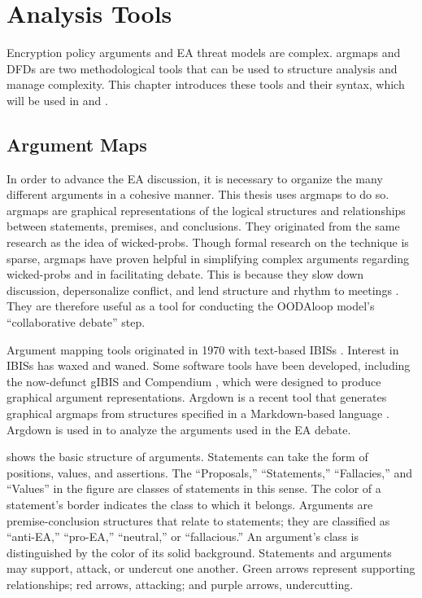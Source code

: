 \chapter{Analysis Tools}
\label{chap-tools}

Encryption policy arguments and \acl{EA} threat models are complex. \Acp{argmap} and \aclp{DFD} are two methodological
tools that can be used to structure analysis and manage complexity. This chapter introduces these tools and their
syntax, which will be used in  and .


\section{Argument Maps}
\label{sec-arg-maps-intro}

In order to advance the \ac{EA} discussion, it is necessary to organize the many different arguments in a cohesive
manner. This thesis uses \acp{argmap} to do so. \Acp{argmap} are graphical representations of the logical structures and
relationships between statements, premises, and conclusions. They originated from the same research as the idea of
\acp{wicked-prob}. Though formal research on the technique is sparse, \acp{argmap} have proven helpful in simplifying
complex arguments regarding \acp{wicked-prob} \cite{renton_2007} and in facilitating debate. This is because they slow
down discussion, depersonalize conflict, and lend structure and rhythm to meetings \cite{dutoit_hypermedia_2006}. They
are therefore useful as a tool for conducting the \ac{OODAloop} model's ``collaborative debate'' step.

Argument mapping tools originated in 1970 with text-based \acp{IBIS} \cite{kunz_issues_1970}. Interest in \acp{IBIS} has
waxed and waned. Some software tools have been developed, including the now-defunct gIBIS \cite{conklin_gibis_1988} and
Compendium \cite{dutoit_hypermedia_2006}, which were designed to produce graphical argument representations. Argdown is
a recent tool that generates graphical \acp{argmap} from structures specified in a Markdown-based language
\cite{voigt_argdown_2018}. Argdown is used in  to analyze the arguments used in the \ac{EA}
debate.

 shows the basic structure of arguments. Statements can take the form of positions, values, and
assertions. The ``Proposals,'' ``Statements,'' ``Fallacies,'' and ``Values'' in the figure are classes of statements in
this sense. The color of a statement's border indicates the class to which it belongs. Arguments are premise-conclusion
structures that relate to statements; they are classified as ``anti-EA,'' ``pro-EA,'' ``neutral,'' or ``fallacious.'' An
argument's class is distinguished by the color of its solid background. Statements and arguments may support, attack, or
undercut one another. Green arrows represent supporting relationships; red arrows, attacking; and purple arrows,
undercutting.

